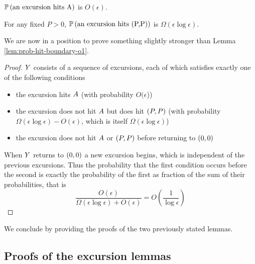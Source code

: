 {\newcommand{\Omegaeloge}{\Omega(\epsilon\log\epsilon)}

\begin{lemma}
  \label{lem:Phitboundaryline}
  $\mathbb{P}\left(\text{an excursion hits A}\right)$ is $O(\epsilon)$.
\end{lemma}

\begin{lemma}
  \label{lem:Pabsorbedandtravelsfar}
  For any fixed $P > 0$, $\mathbb{P}\left(\text{an excursion hits (P,P)}\right)$ is $\Omegaeloge$.
\end{lemma}

We are now in a position to prove something slightly stronger than
Lemma \ref{lem:prob-hit-boundary-o1}.

\begin{lemma}\label{lem:prob-hit-boundary-o1loge}
\end{lemma}

\newcommand{\Oe}{O(\epsilon)}

\begin{proof}
  $Y$ consists of a sequence of excursions, each of which satisfies
  exactly one of the following conditions
  \begin{itemize}
  \item the excursion hits $A$ (with probability
    $O(\epsilon$))
  \item the excursion does not hit $A$ but does hit
    $(P,P)$ (with probability $\Omegaeloge-\Oe$, which is itself
    $\Omegaeloge$)
  \item the excursion does not hit $A$ or $(P,P)$ before
    returning to $(0,0)$
  \end{itemize}
  When $Y$ returns to $(0,0)$ a new excursion begins, which is independent of
  the previous excursions.  Thus the probability that the first
  condition occurs before the second is exactly the probability of the
  first as fraction of the sum of their probabilities, that is
  \[
  \frac{\Oe}{\Omegaeloge + \Oe} = O\left(\frac{1}{\log\epsilon}\right)
  \]
\end{proof}

We conclude by providing the proofs of the two previously
stated lemmas.

\subsection{Proofs of the excursion lemmas}
\newcommand{\tdh}{\rotproc^1}
\newcommand{\tdv}{\rotproc^2}
\newcommand{\rotproc}{Z}

}
